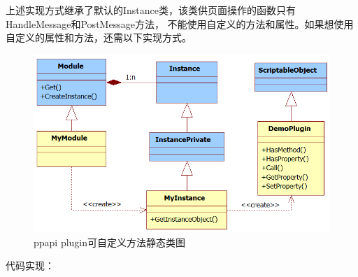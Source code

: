\vspace{10ex}
上述实现方式继承了默认的Instance类，该类供页面操作的函数只有HandleMessage和PostMessage方法，
不能使用自定义的方法和属性。如果想使用自定义的属性和方法，还需以下实现方式。
\begin{figure}[H] 
  \centering 
  \includegraphics[width=\textwidth]{image/ppapi/ppapi_class1.jpg} 
  \caption{ppapi plugin可自定义方法静态类图}
\end{figure}
代码实现：
